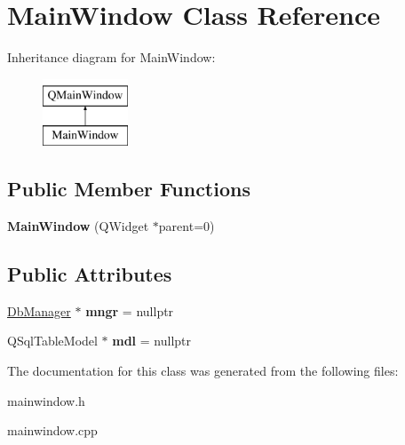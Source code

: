 \hypertarget{class_main_window}{}\section{Main\+Window Class Reference}
\label{class_main_window}
Inheritance diagram for Main\+Window\+:\begin{figure}[H]
\begin{center}
\leavevmode
\includegraphics[height=2.000000cm]{class_main_window}
\end{center}
\end{figure}
\subsection*{Public Member Functions}
\begin{DoxyCompactItemize}
\item 
\mbox{\label{class_main_window_a8b244be8b7b7db1b08de2a2acb9409db}} 
{\bfseries Main\+Window} (Q\+Widget $\ast$parent=0)
\end{DoxyCompactItemize}
\subsection*{Public Attributes}
\begin{DoxyCompactItemize}
\item 
\mbox{\label{class_main_window_a29a7d3c84689e952e3226a9d53d09cf4}} 
\hyperlink{class_db_manager}{Db\+Manager} $\ast$ {\bfseries mngr} = nullptr
\item 
\mbox{\label{class_main_window_a5556112edb83f621ccb8f53e067ec7a7}} 
Q\+Sql\+Table\+Model $\ast$ {\bfseries mdl} = nullptr
\end{DoxyCompactItemize}


The documentation for this class was generated from the following files\+:\begin{DoxyCompactItemize}
\item 
mainwindow.\+h\item 
mainwindow.\+cpp\end{DoxyCompactItemize}
